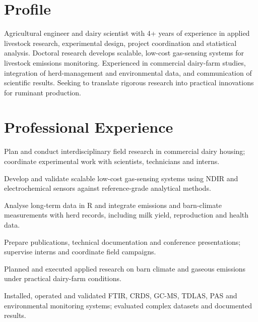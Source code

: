 
\section*{Profile}
Agricultural engineer and dairy scientist with 4+ years of experience in applied livestock research, experimental design, project coordination and statistical analysis. Doctoral research develops scalable, low-cost gas-sensing systems for livestock emissions monitoring. Experienced in commercial dairy-farm studies, integration of herd-management and environmental data, and communication of scientific results. Seeking to translate rigorous research into practical innovations for ruminant production.

\section*{Professional Experience}
\begin{cvitems}
  \item Plan and conduct interdisciplinary field research in commercial dairy housing; coordinate experimental work with scientists, technicians and interns.
  \item Develop and validate scalable low-cost gas-sensing systems using NDIR and electrochemical sensors against reference-grade analytical methods.
  \item Analyse long-term data in R and integrate emissions and barn-climate measurements with herd records, including milk yield, reproduction and health data.
  \item Prepare publications, technical documentation and conference presentations; supervise interns and coordinate field campaigns.
\end{cvitems}

\begin{cvitems}
  \item Planned and executed applied research on barn climate and gaseous emissions under practical dairy-farm conditions.
  \item Installed, operated and validated FTIR, CRDS, GC-MS, TDLAS, PAS and environmental monitoring systems; evaluated complex datasets and documented results.
\end{cvitems}

